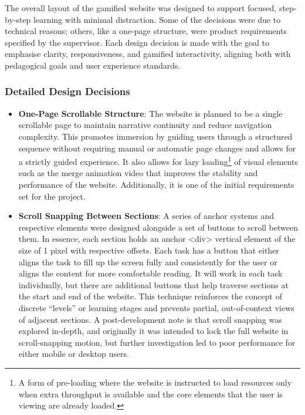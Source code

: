 The overall layout of the gamified website was designed to support focused, step-by-step learning with minimal distraction. 
Some of the decisions were due to technical reasons; others, like a one-page structure, were product requirements specified by the supervisor.
Each design decision is made with the goal to emphasise clarity, responsiveness, and gamified interactivity, aligning both with pedagogical goals and user experience standards.

\subsubsection{Detailed Design Decisions}

\begin{itemize}
    \item \textbf{One-Page Scrollable Structure}: The website is planned to be a single scrollable page to maintain narrative continuity and reduce navigation complexity. 
    This promotes immersion by guiding users through a structured sequence without requiring manual or automatic page changes and allows for a strictly guided experience. 
    It also allows for lazy loading\footnote{A form of pre-loading where the website is instructed to load resources only when extra throughput is available and the core elements that the user is viewing are already loaded.} of visual elements such as the merge animation video that improves the stability and performance of the website. 
    Additionally, it is one of the initial requirements set for the project. 
    \item \textbf{Scroll Snapping Between Sections}: A series of anchor systems and respective elements were designed alongside a set of buttons to scroll between them. 
    In essence, each section holds an anchor <div> vertical element of the size of 1 pixel with respective offsets. 
    Each task has a button that either aligns the task to fill up the screen fully and consistently for the user or aligns the content for more comfortable reading. 
    It will work in each task individually, but there are additional buttons that help traverse sections at the start and end of the website. 
    This technique reinforces the concept of discrete “levels” or learning stages and prevents partial, out-of-context views of adjacent sections. 
    A post-development note is that scroll snapping was explored in-depth, and originally it was intended to lock the full website in scroll-snapping motion, but further investigation led to poor performance for either mobile or desktop users. 

\end{itemize}

